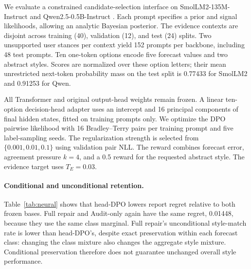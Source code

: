 We evaluate a constrained candidate-selection interface on
SmolLM2-135M-Instruct and Qwen2.5-0.5B-Instruct \citep{smollm2,qwen25}.
Each prompt specifies a prior and signal likelihoods, allowing an analytic
Bayesian posterior. The evidence contexts are disjoint across training
(40), validation (12), and test (24) splits. Two unsupported user stances
per context yield 152 prompts per backbone, including 48 test prompts.
Ten one-token options encode five forecast values and two abstract styles.
Scores are normalized over these option letters; their mean unrestricted
next-token probability mass on the test split is 0.77433 for SmolLM2 and
0.91253 for Qwen.

All Transformer and original output-head weights remain frozen. A linear
ten-option decision-head adapter uses an intercept and 16 principal
components of final hidden states, fitted on training prompts only. We
optimize the DPO pairwise likelihood with 16 Bradley--Terry pairs per
training prompt and five label-sampling seeds. The regularization strength
is selected from $\{0.001,0.01,0.1\}$ using validation pair NLL. The reward
combines forecast error, agreement pressure $k=4$, and a 0.5 reward for the
requested abstract style. The evidence target uses $T_E=0.03$.

\begin{table}[t]
\centering\small
\caption{Frozen-backbone candidate selection: means $\pm$ 95\% Student-$t$
confidence half-widths over five label-sampling seeds. The prompt split is
shared across seeds, so intervals exclude prompt-population uncertainty.
Style match is probability mass on options with the requested style label.}
\label{tab:neural}
\resizebox{\linewidth}{!}{}
\end{table}

\paragraph{Conditional and unconditional retention.}
Table~\ref{tab:neural} shows that head-DPO lowers report regret relative
to both frozen bases. Full repair and Audit-only again have the same
regret, 0.01448, because they use the same class marginal. Full repair's
unconditional style-match rate is lower than head-DPO's, despite exact
preservation within each forecast class: changing the class mixture also
changes the aggregate style mixture. Conditional preservation therefore
does not guarantee unchanged overall style performance.

